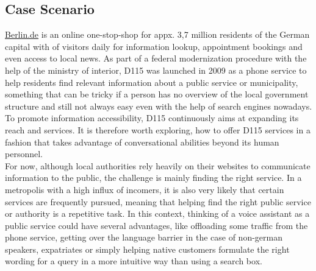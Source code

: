 \subsection{Case Scenario}
\href{https://www.berlin.de}{Berlin.de} is an online one-stop-shop for appx. 3,7 million residents of the German capital\cite{zensus} with  of visitors daily for information lookup, appointment bookings and even access to local news. As part of a federal modernization procedure with the help of the ministry of interior, D115 was launched in 2009 \cite{d115} as a phone service to help residents find relevant information about a public service or municipality, something that can be tricky if a person has no overview of the local government structure and still not always easy even with the help of search engines nowadays.
To promote information accessibility, D115 continuously aims at expanding its reach and services.
It is therefore worth exploring, how to offer D115 services in a fashion that takes advantage of conversational abilities beyond its human personnel. 
\\

For now, although local authorities rely heavily on their websites to communicate information to the public, the challenge is mainly finding the right service. %
In a metropolis with a high influx of incomers, it is also very likely that certain services are frequently pursued, meaning that helping find the right public service or authority is a repetitive task. In this context, thinking of a voice assistant as a public service could have several advantages, like offloading some traffic from the phone service, getting over the language barrier in the case of non-german speakers, expatriates or simply helping native customers formulate the right wording for a query in a more intuitive way than using a search box. 




